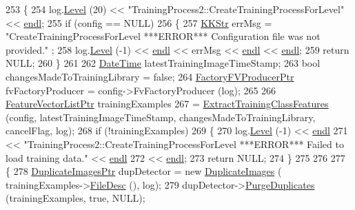 \begin{DoxyCode}
253 \{
254   log.\hyperlink{class_k_k_b_1_1_run_log_a32cf761d7f2e747465fd80533fdbb659}{Level} (20) << \textcolor{stringliteral}{"TrainingProcess2::CreateTrainingProcessForLevel"} << 
      \hyperlink{namespace_k_k_b_ad1f50f65af6adc8fa9e6f62d007818a8}{endl};
255   \textcolor{keywordflow}{if}  (config == NULL)
256   \{
257     \hyperlink{class_k_k_b_1_1_k_k_str}{KKStr} errMsg = \textcolor{stringliteral}{"CreateTrainingProcessForLevel  ***ERROR***   Configuration file was not provided."}
      ;
258     log.\hyperlink{class_k_k_b_1_1_run_log_a32cf761d7f2e747465fd80533fdbb659}{Level} (-1) << \hyperlink{namespace_k_k_b_ad1f50f65af6adc8fa9e6f62d007818a8}{endl} << errMsg << \hyperlink{namespace_k_k_b_ad1f50f65af6adc8fa9e6f62d007818a8}{endl} << \hyperlink{namespace_k_k_b_ad1f50f65af6adc8fa9e6f62d007818a8}{endl};
259     \textcolor{keywordflow}{return}  NULL;
260   \}
261 
262   \hyperlink{class_k_k_b_1_1_date_time}{DateTime}  latestTrainingImageTimeStamp;
263   \textcolor{keywordtype}{bool}  changesMadeToTrainingLibrary = \textcolor{keyword}{false};
264   \hyperlink{class_k_k_m_l_l_1_1_factory_f_v_producer}{FactoryFVProducerPtr}  fvFactoryProducer = config->FvFactoryProducer (log);
265 
266   \hyperlink{class_k_k_m_l_l_1_1_feature_vector_list}{FeatureVectorListPtr}  trainingExamples 
267     = \hyperlink{class_k_k_m_l_l_1_1_training_process2_aa1f7422d93e5db2d5f540d657b14720f}{ExtractTrainingClassFeatures} (config, latestTrainingImageTimeStamp, 
      changesMadeToTrainingLibrary, cancelFlag, log);
268   \textcolor{keywordflow}{if}  (!trainingExamples)
269   \{
270     log.\hyperlink{class_k_k_b_1_1_run_log_a32cf761d7f2e747465fd80533fdbb659}{Level} (-1) << \hyperlink{namespace_k_k_b_ad1f50f65af6adc8fa9e6f62d007818a8}{endl}
271       << \textcolor{stringliteral}{"TrainingProcess2::CreateTrainingProcessForLevel   ***ERROR***   Failed to load training data."} <<
       \hyperlink{namespace_k_k_b_ad1f50f65af6adc8fa9e6f62d007818a8}{endl}
272       << \hyperlink{namespace_k_k_b_ad1f50f65af6adc8fa9e6f62d007818a8}{endl};
273     \textcolor{keywordflow}{return} NULL;
274   \}
275 
276 
277   \{
278     \hyperlink{class_k_k_m_l_l_1_1_duplicate_images}{DuplicateImagesPtr}  dupDetector = \textcolor{keyword}{new} \hyperlink{class_k_k_m_l_l_1_1_duplicate_images}{DuplicateImages} (
      trainingExamples->\hyperlink{class_k_k_m_l_l_1_1_feature_vector_list_a736923be9c4ac7553a5aa87dd24efd16}{FileDesc} (), log);
279     dupDetector->\hyperlink{class_k_k_m_l_l_1_1_duplicate_images_ae66271631fe02e9db051968b728769e7}{PurgeDuplicates} (trainingExamples, \textcolor{keyword}{true}, NULL);

\end{DoxyCode}
